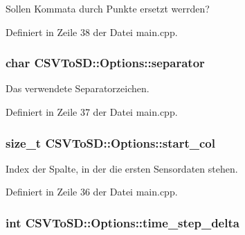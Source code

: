 Sollen Kommata durch Punkte ersetzt werrden? 



Definiert in Zeile 38 der Datei main.\-cpp.

\hypertarget{structCSVToSD_1_1Options_afa7a79f38999d3c89f7ffa67f74bfbd4}{
\subsubsection[{separator}]{\setlength{\rightskip}{0pt plus 5cm}char C\-S\-V\-To\-S\-D\-::\-Options\-::separator}}\label{structCSVToSD_1_1Options_afa7a79f38999d3c89f7ffa67f74bfbd4}


Das verwendete Separatorzeichen. 



Definiert in Zeile 37 der Datei main.\-cpp.

\hypertarget{structCSVToSD_1_1Options_a70d85339b25b5fa4db8750fb78203e5e}{
\subsubsection[{start\-\_\-col}]{\setlength{\rightskip}{0pt plus 5cm}size\-\_\-t C\-S\-V\-To\-S\-D\-::\-Options\-::start\-\_\-col}}\label{structCSVToSD_1_1Options_a70d85339b25b5fa4db8750fb78203e5e}


Index der Spalte, in der die ersten Sensordaten stehen. 



Definiert in Zeile 36 der Datei main.\-cpp.

\hypertarget{structCSVToSD_1_1Options_a4bdb2207018549711acd7e6cbd61d082}{
\subsubsection[{time\-\_\-step\-\_\-delta}]{\setlength{\rightskip}{0pt plus 5cm}int C\-S\-V\-To\-S\-D\-::\-Options\-::time\-\_\-step\-\_\-delta}}\label{structCSVToSD_1_1Options_a4bdb2207018549711acd7e6cbd61d082}


